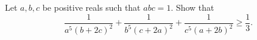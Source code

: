 Let $a, b, c$ be positive reals such that $abc=1$. Show that \[\frac{1}{a^5(b+2c)^2} + \frac{1}{b^5(c+2a)^2} + \frac{1}{c^5(a+2b)^2} \ge \frac{1}{3}.\]